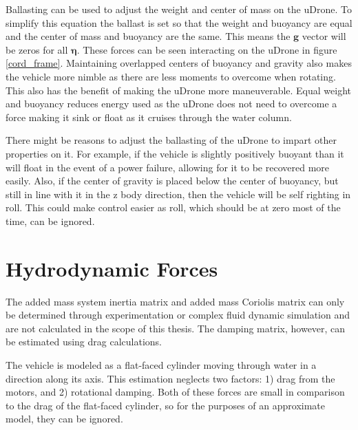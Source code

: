 
Ballasting can be used to adjust the weight and center of mass on the uDrone. To simplify this equation the ballast is set so that the weight and buoyancy are equal and the center of mass and buoyancy are the same. This means the $\boldsymbol{g}$ vector will be zeros for all $\boldsymbol{\eta}$. These forces can be seen interacting on the uDrone in figure \ref{cord_frame}. Maintaining overlapped centers of buoyancy and gravity also makes the vehicle more nimble as there are less moments to overcome when rotating. This also has the benefit of making the uDrone more maneuverable. Equal weight and buoyancy reduces energy used as the uDrone does not need to overcome a force making it sink or float as it cruises through the water column. 

There might be reasons to adjust the ballasting of the uDrone to impart other properties on it. For example, if the vehicle is slightly positively buoyant than it will float in the event of a power failure, allowing for it to be recovered more easily. Also, if the center of gravity is placed below the center of buoyancy, but still in line with it in the z body direction, then the vehicle will be self righting in roll. This could make control easier as roll, which should be at zero most of the time, can be ignored.

\section{Hydrodynamic Forces} \label{hydrodynamics}

The added mass system inertia matrix and added mass Coriolis matrix can only be determined through experimentation or complex fluid dynamic simulation and are not calculated in the scope of this thesis. The damping matrix, however, can be estimated using drag calculations. 

The vehicle is modeled as a flat-faced cylinder moving through water in a direction along its axis. This estimation neglects two factors: 1) drag from the motors, and 2) rotational damping. Both of these forces are small in comparison to the drag of the flat-faced cylinder, so for the purposes of an approximate model, they can be ignored. 

